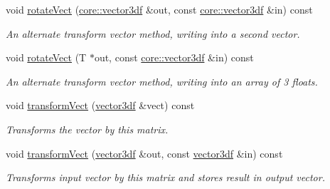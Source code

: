 \begin{DoxyCompactItemize}
void \hyperlink{classirr_1_1core_1_1CMatrix4_aa421db751017ae447e20ac946bb4ad92}{rotate\+Vect} (\hyperlink{namespaceirr_1_1core_ae6e2b2a6c552833ebbd5b7463d03586b}{core\+::vector3df} \&out, const \hyperlink{namespaceirr_1_1core_ae6e2b2a6c552833ebbd5b7463d03586b}{core\+::vector3df} \&in) const
\begin{DoxyCompactList}\small\item\em An alternate transform vector method, writing into a second vector. \end{DoxyCompactList}\item 
\mbox{\label{classirr_1_1core_1_1CMatrix4_aceb5e3d8e3b1816b6df5e83717425b7f}} 
void \hyperlink{classirr_1_1core_1_1CMatrix4_aceb5e3d8e3b1816b6df5e83717425b7f}{rotate\+Vect} (T $\ast$out, const \hyperlink{namespaceirr_1_1core_ae6e2b2a6c552833ebbd5b7463d03586b}{core\+::vector3df} \&in) const
\begin{DoxyCompactList}\small\item\em An alternate transform vector method, writing into an array of 3 floats. \end{DoxyCompactList}\item 
\mbox{\label{classirr_1_1core_1_1CMatrix4_a4f100721bb28df8b71b21ec10b9c2db6}} 
void \hyperlink{classirr_1_1core_1_1CMatrix4_a4f100721bb28df8b71b21ec10b9c2db6}{transform\+Vect} (\hyperlink{namespaceirr_1_1core_ae6e2b2a6c552833ebbd5b7463d03586b}{vector3df} \&vect) const
\begin{DoxyCompactList}\small\item\em Transforms the vector by this matrix. \end{DoxyCompactList}\item 
\mbox{\label{classirr_1_1core_1_1CMatrix4_a4d530a7c16fa9f6c025c1508e0058451}} 
void \hyperlink{classirr_1_1core_1_1CMatrix4_a4d530a7c16fa9f6c025c1508e0058451}{transform\+Vect} (\hyperlink{namespaceirr_1_1core_ae6e2b2a6c552833ebbd5b7463d03586b}{vector3df} \&out, const \hyperlink{namespaceirr_1_1core_ae6e2b2a6c552833ebbd5b7463d03586b}{vector3df} \&in) const
\begin{DoxyCompactList}\small\item\em Transforms input vector by this matrix and stores result in output vector. \end{DoxyCompactList}\item 
\mbox{\label{classirr_1_1core_1_1CMatrix4_a1f23d4c668869f28c89d400518352879}} 

\end{DoxyCompactItemize}
